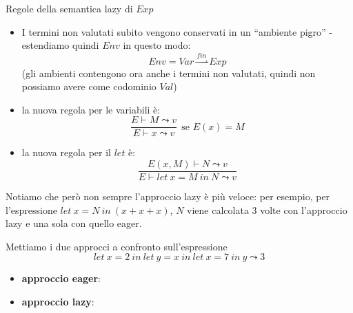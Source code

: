 \documentclass[a4paper,11pt]{report}
\newcommand{\farrow}{\overset{fin}{\rightharpoonup}}
\begin{document}
\begin{defframe}{Regole della semantica lazy di \(Exp\)}{}
   \begin{itemize}
    \item I termini non valutati subito vengono conservati in un ``ambiente pigro'' - estendiamo quindi \( Env \) in questo modo:
   \[ Env = Var \farrow Exp \]
   (gli ambienti contengono ora anche i termini non valutati, quindi non possiamo avere come codominio \( Val \))

\item la nuova regola per le variabili è:
    \[ \frac{E\vdash M \leadsto v}{E\vdash x \leadsto v} \ \ \text{se } E(x)=M\]

\item la nuova regola per il \( let \) è:
    \[ \frac{E(x, M)\vdash N \leadsto v}{E \vdash let \ x = M \ in \ N \leadsto v} \]

   \end{itemize}
\end{defframe}

Notiamo che però non sempre l'approccio lazy è più veloce: per esempio, per l'espressione \( let \ x = N \ in \ (x+x+x) \), \( N \) viene calcolata \( 3 \) volte con l'approccio lazy e una sola con quello eager.


Mettiamo i due approcci a confronto sull'espressione \[ let \ x = 2 \ in \ let \ y = x \ in \ let \ x = 7 \ in \ y \leadsto 3 \]
  
  \begin{itemize}
      \item \textbf{approccio eager}:
  \end{itemize}
  \vspace{-1em}
\begin{prooftree}
\end{prooftree}

  \begin{itemize}
      \item \textbf{approccio lazy}:
  \end{itemize}
  \vspace{-1em}
\end{document}
